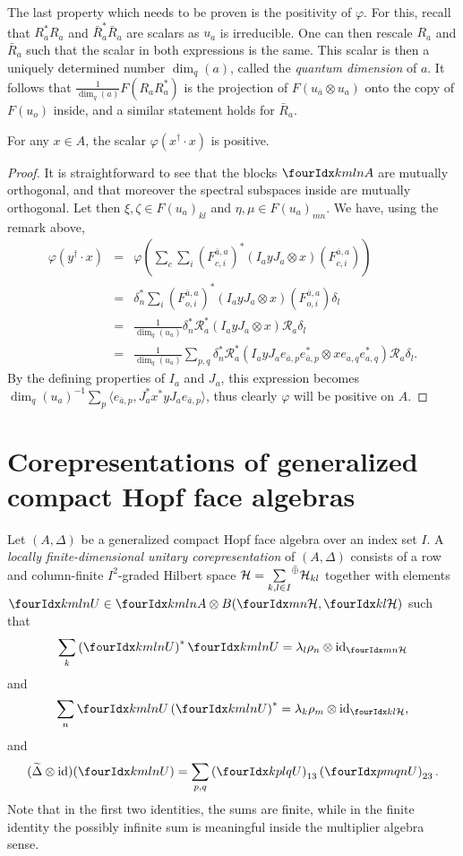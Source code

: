 The last property which needs to be proven is the positivity of $\varphi$. For this, recall that $R_a^*R_a$ and $\bar{R}_a^*\bar{R}_a$ are scalars as $u_a$ is irreducible. One can then rescale $R_a$ and $\bar{R}_a$ such that the scalar in both expressions is the same. This scalar is then a uniquely determined number $\dim_q(a)$, called the \emph{quantum dimension} of $a$. It follows that $\frac{1}{\dim_q(a)}F(R_aR_a^*)$ is the projection of $F(u_{\bar{a}}\otimes u_a)$ onto the copy of $F(u_o)$ inside, and a similar statement holds for $\bar{R}_a$.

\begin{Prop} For any $x\in A$, the scalar $\varphi(x^{\dagger}\cdot x)$ is positive.
\end{Prop}

\begin{proof} It is straightforward to see that the blocks $\Gr{A}{k}{l}{m}{n}$ are mutually orthogonal, and that moreover the spectral subspaces inside are mutually orthogonal. Let then $\xi,\zeta \in F(u_a)_{kl}$ and $\eta,\mu\in F(u_a)_{mn}$. We have, using the remark above, \begin{eqnarray*} \varphi(y^{\dag}\cdot x) &=& \varphi(\sum_c\sum_i \left(F_{c,i}^{\bar{a},a}\right)^*(I_ayJ_a\otimes x)\left(F_{c,i}^{\bar{a},a}\right))\\ &=& \delta_n^* \sum_i \left(F_{o,i}^{\bar{a},a}\right)^*(I_ayJ_a\otimes x)\left(F_{o,i}^{\bar{a},a}\right)\delta_l\\ &=& \frac{1}{\dim_q(u_a)} \delta_n^* \mathscr{R}_a^*(I_ayJ_a\otimes x)\mathscr{R}_a\delta_l \\ &=& \frac{1}{\dim_q(u_a)}\sum_{p,q}\delta_n^*\mathscr{R}_a^*(I_ayJ_ae_{\bar{a},p}e_{\bar{a},p}^*\otimes xe_{a,q}e_{a,q}^*)\mathscr{R}_a\delta_l.\end{eqnarray*} By the defining properties of $I_a$ and $J_a$, this expression becomes $\dim_q(u_a)^{-1}\sum_{p} \langle e_{\bar{a},p},J_a^*x^*yJ_ae_{\bar{a},p}\rangle$, thus clearly $\varphi$ will be positive on $A$.
\end{proof}

\section*{Corepresentations of generalized compact Hopf face algebras}

Let $(A,\Delta)$ be a generalized compact Hopf face algebra over an index set $I$. A \emph{locally finite-dimensional unitary corepresentation} of $(A,\Delta)$ consists of a row and column-finite $I^2$-graded Hilbert space $\mathcal{H} = \underset{k,l\in I}{\sum}^{\bar{\oplus}}\mathcal{H}_{kl}$ together with elements $\Gr{U}{k}{l}{m}{n}\in \Gr{A}{k}{l}{m}{n}\otimes B(\Gru{\Hsp}{m}{n},\Gru{\Hsp}{k}{l})$ such that \[\sum_{k} \left(\Gr{U}{k}{l}{m}{n}\right)^*\Gr{U}{k}{l}{m}{n} = \lambda_l\rho_n \otimes \id_{\Gru{\Hsp}{m}{n}}\] and \[\sum_{n} \Gr{U}{k}{l}{m}{n}\left(\Gr{U}{k}{l}{m}{n}\right)^* = \lambda_k\rho_m \otimes \id_{\Gru{\Hsp}{k}{l}},\] and \[(\wDelta\otimes \id)(\Gr{U}{k}{l}{m}{n}) = \sum_{p,q} \left(\Gr{U}{k}{l}{p}{q}\right)_{13}\left(\Gr{U}{p}{q}{m}{n}\right)_{23}.\] Note that in the first two identities, the sums are finite, while in the finite identity the possibly infinite sum is meaningful inside the multiplier algebra sense.

